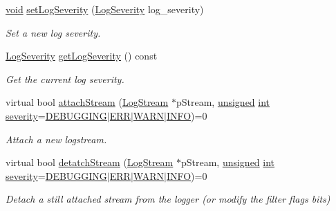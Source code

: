 \begin{DoxyCompactItemize}
\hyperlink{wglew_8h_aeea6e3dfae3acf232096f57d2d57f084}{void} \hyperlink{class_assimp_1_1_logger_a8fb4fa4c2c329a36ac39bc9c743925f1}{set\-Log\-Severity} (\hyperlink{class_assimp_1_1_logger_a8b6248a0fd062431e8572556350d29e6}{Log\-Severity} log\-\_\-severity)
\begin{DoxyCompactList}\small\item\em Set a new log severity. \end{DoxyCompactList}\item 
\hyperlink{class_assimp_1_1_logger_a8b6248a0fd062431e8572556350d29e6}{Log\-Severity} \hyperlink{class_assimp_1_1_logger_a2b4cee0d7f1f8948308ab6a8ee1a3dc7}{get\-Log\-Severity} () const 
\begin{DoxyCompactList}\small\item\em Get the current log severity. \end{DoxyCompactList}\item 
virtual bool \hyperlink{class_assimp_1_1_logger_a56fbf4f392712f06d3c5bb581c3f3906}{attach\-Stream} (\hyperlink{class_assimp_1_1_log_stream}{Log\-Stream} $\ast$p\-Stream, \hyperlink{_free_image_8h_a425076c7067a1b5166e2cc530e914814}{unsigned} \hyperlink{wglew_8h_a500a82aecba06f4550f6849b8099ca21}{int} \hyperlink{glew_8h_acc39d4387d4f2d172de77ed0c5208990}{severity}=\hyperlink{class_assimp_1_1_logger_acd0b52a87d6fc11e957ed2c6e2ad75b6a1c233dd8bb46dc4386948a03877b8160}{D\-E\-B\-U\-G\-G\-I\-N\-G}$\vert$\hyperlink{class_assimp_1_1_logger_acd0b52a87d6fc11e957ed2c6e2ad75b6a2dd325191d60507ab0afd01ea3add8d1}{E\-R\-R}$\vert$\hyperlink{class_assimp_1_1_logger_acd0b52a87d6fc11e957ed2c6e2ad75b6abea27a64e7f7cc758549526f953c26f2}{W\-A\-R\-N}$\vert$\hyperlink{class_assimp_1_1_logger_acd0b52a87d6fc11e957ed2c6e2ad75b6a5631a164f078d5f7e8780cf88d1d45d6}{I\-N\-F\-O})=0
\begin{DoxyCompactList}\small\item\em Attach a new logstream. \end{DoxyCompactList}\item 
virtual bool \hyperlink{class_assimp_1_1_logger_ac89b2edd326dda9046fe9d4e1f4d10fc}{detatch\-Stream} (\hyperlink{class_assimp_1_1_log_stream}{Log\-Stream} $\ast$p\-Stream, \hyperlink{_free_image_8h_a425076c7067a1b5166e2cc530e914814}{unsigned} \hyperlink{wglew_8h_a500a82aecba06f4550f6849b8099ca21}{int} \hyperlink{glew_8h_acc39d4387d4f2d172de77ed0c5208990}{severity}=\hyperlink{class_assimp_1_1_logger_acd0b52a87d6fc11e957ed2c6e2ad75b6a1c233dd8bb46dc4386948a03877b8160}{D\-E\-B\-U\-G\-G\-I\-N\-G}$\vert$\hyperlink{class_assimp_1_1_logger_acd0b52a87d6fc11e957ed2c6e2ad75b6a2dd325191d60507ab0afd01ea3add8d1}{E\-R\-R}$\vert$\hyperlink{class_assimp_1_1_logger_acd0b52a87d6fc11e957ed2c6e2ad75b6abea27a64e7f7cc758549526f953c26f2}{W\-A\-R\-N}$\vert$\hyperlink{class_assimp_1_1_logger_acd0b52a87d6fc11e957ed2c6e2ad75b6a5631a164f078d5f7e8780cf88d1d45d6}{I\-N\-F\-O})=0
\begin{DoxyCompactList}\small\item\em Detach a still attached stream from the logger (or modify the filter flags bits) \end{DoxyCompactList}\end{DoxyCompactItemize}
